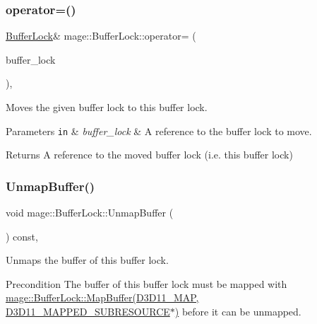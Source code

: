\subsubsection{\texorpdfstring{operator=()}{operator=()}\hspace{0.1cm}{\footnotesize\ttfamily [2/2]}}
{\footnotesize\ttfamily \hyperlink{classmage_1_1_buffer_lock}{Buffer\+Lock}\& mage\+::\+Buffer\+Lock\+::operator= (\begin{DoxyParamCaption}\item[{\hyperlink{classmage_1_1_buffer_lock}{Buffer\+Lock} \&\&}]{buffer\+\_\+lock }\end{DoxyParamCaption})\hspace{0.3cm}{\ttfamily [default]}, {\ttfamily [noexcept]}}

Moves the given buffer lock to this buffer lock.


\begin{DoxyParams}[1]{Parameters}
\mbox{\tt in}  & {\em buffer\+\_\+lock} & A reference to the buffer lock to move. \\
\hline
\end{DoxyParams}
\begin{DoxyReturn}{Returns}
A reference to the moved buffer lock (i.\+e. this buffer lock) 
\end{DoxyReturn}
\hypertarget{classmage_1_1_buffer_lock_a04b6cec5445a88d27f27cff4e7773535}{}\label{classmage_1_1_buffer_lock_a04b6cec5445a88d27f27cff4e7773535} 
\subsubsection{\texorpdfstring{Unmap\+Buffer()}{UnmapBuffer()}}
{\footnotesize\ttfamily void mage\+::\+Buffer\+Lock\+::\+Unmap\+Buffer (\begin{DoxyParamCaption}{ }\end{DoxyParamCaption}) const\hspace{0.3cm}{\ttfamily [private]}, {\ttfamily [noexcept]}}

Unmaps the buffer of this buffer lock.

\begin{DoxyPrecond}{Precondition}
The buffer of this buffer lock must be mapped with \hyperlink{classmage_1_1_buffer_lock_adcc9d3190b179efb5045f33551e177f7}{mage\+::\+Buffer\+Lock\+::\+Map\+Buffer(\+D3\+D11\+\_\+\+M\+A\+P, D3\+D11\+\_\+\+M\+A\+P\+P\+E\+D\+\_\+\+S\+U\+B\+R\+E\+S\+O\+U\+R\+C\+E$\ast$)} before it can be unmapped. 
\end{DoxyPrecond}



